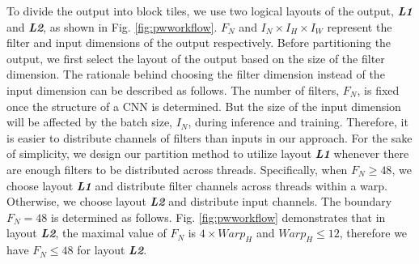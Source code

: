 To divide the output into block tiles, we use two logical layouts of the output, \textbf{\emph{L1}} and \textbf{\emph{L2}}, as shown in Fig. \ref{fig:pwworkflow}.
$F_N$ and $I_N \times I_H \times I_W$ represent the filter and input dimensions of the output respectively.
Before partitioning the output, we first select the layout of the output based on the size of the filter dimension.
The rationale behind choosing the filter dimension instead of the input dimension can be described as follows.
The number of filters, $F_N$, is fixed once the structure of a CNN is determined.
But the size of the input dimension will be affected by the batch size, $I_N$, during inference and training.
Therefore, it is easier to distribute channels of filters than inputs in our approach.
For the sake of simplicity, we design our partition method to utilize layout \textbf{\emph{L1}} whenever there are enough filters to be distributed across threads.
Specifically, when $F_N \ge 48$, we choose layout \textbf{\emph{L1}} and distribute filter channels across threads within a warp.
Otherwise, we choose layout \textbf{\emph{L2}} and distribute input channels.
The boundary $F_N = 48$ is determined as follows.
Fig. \ref{fig:pwworkflow} demonstrates that in layout \textbf{\emph{L2}}, the maximal value of $F_N$ is $4 \times Warp_H$ and $Warp_H \leq 12$, therefore we have $F_N \leq 48$ for layout \textbf{\emph{L2}}.

